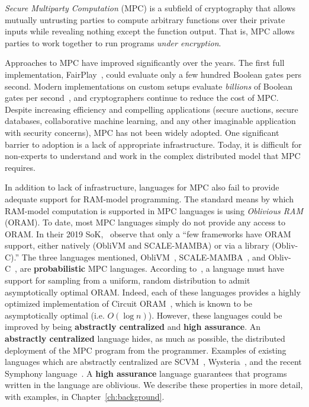 \documentclass{report}
\begin{document}
\emph{Secure Multiparty Computation} (MPC) is a subfield of cryptography
that allows mutually untrusting parties to compute arbitrary functions over their private inputs while revealing nothing
except the function output. That is, MPC allows parties to work together to run programs \emph{under encryption}.

Approaches to MPC have improved significantly over the years. The first full implementation, FairPlay~\cite{todo}, could evaluate
only a few hundred Boolean gates pers second. Modern implementations on custom setups evaluate \emph{billions} of Boolean gates per
second~\cite{todo}, and cryptographers continue to reduce the cost of MPC. Despite increasing efficiency and compelling applications
(secure auctions, secure databases, collaborative machine learning, and any other imaginable application with security concerns),
MPC has not been widely adopted. One significant barrier to adoption is a lack of appropriate infrastructure. Today, it is difficult
for non-experts to understand and work in the complex distributed model that MPC requires.

In addition to lack of infrastructure, languages for MPC also fail to provide adequate support for RAM-model programming. The standard
means by which RAM-model computation is supported in MPC languages is using \emph{Oblivious RAM} (ORAM). To date, most MPC languages
simply do not provide any access to ORAM. In their 2019 SoK,~\citet{todo} observe that only a ``few frameworks have ORAM support, either
natively (ObliVM and SCALE-MAMBA) or via a library (Obliv-C).'' The three languages mentioned, ObliVM~\cite{todo}, SCALE-MAMBA~\cite{todo}, and
Obliv-C~\cite{todo}, are \textbf{probabilistic} MPC languages. According to~\citet{todo}, a language must have support for sampling
from a uniform, random distribution to admit asymptotically optimal ORAM.
Indeed, each of these languages provides a highly optimized implementation of
Circuit ORAM~\cite{todo}, which is known to be asymptotically optimal (i.e. $O(\log{n})$). However, these languages could be improved by
being \textbf{abstractly centralized} and \textbf{high assurance}. An \textbf{abstractly centralized} language hides, as much as possible,
the distributed deployment of the MPC program from the programmer. Examples of existing languages which are abstractly centralized are
SCVM~\cite{todo}, Wysteria~\cite{todo}, and the recent Symphony language~\cite{todo}. A \textbf{high assurance} language
guarantees that programs written in the language are oblivious.
We describe these properties in more detail, with examples, in Chapter~\ref{ch:background}.
\end{document}
